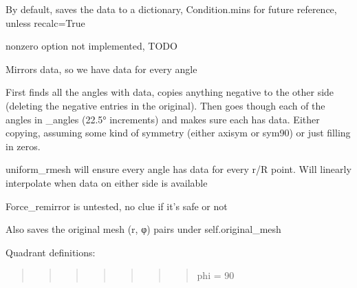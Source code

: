 \documentclass[letterpaper,10pt,english]{sphinxmanual}
\begin{document}
\begin{fulllineitems}
\begin{fulllineitems}
\sphinxAtStartPar
By default, saves the data to a dictionary, Condition.mins
for future reference, unless recalc=True

\sphinxAtStartPar
nonzero option not implemented, TODO

\end{fulllineitems}


\begin{fulllineitems}
\label{\detokenize{api/MARIGOLD.Condition:MARIGOLD.Condition.mirror}}
\pysigstartsignatures
{}
\pysigstopsignatures
\sphinxAtStartPar
Mirrors data, so we have data for every angle

\sphinxAtStartPar
First finds all the angles with data, copies anything negative to the
other side (deleting the negative entries in the original). Then goes
though each of the angles in \_angles (22.5° increments) and makes sure
each has data. Either copying, assuming some kind of symmetry (either
axisym or sym90) or just filling in zeros.

\sphinxAtStartPar
uniform\_rmesh will ensure every angle has data for every r/R point. Will
linearly interpolate when data on either side is available

\sphinxAtStartPar
Force\_remirror is untested, no clue if it’s safe or not

\sphinxAtStartPar
Also saves the original mesh (r, φ) pairs under self.original\_mesh

\sphinxAtStartPar
Quadrant definitions:
\begin{quote}
\begin{quote}
\begin{quote}
\begin{quote}
\begin{quote}
\begin{quote}
\begin{quote}

\sphinxAtStartPar
phi =  90
\end{quote}


\end{quote}
\end{quote}
\end{quote}
\end{quote}
\end{quote}
\end{quote}
\end{fulllineitems}
\end{fulllineitems}
\end{document}

